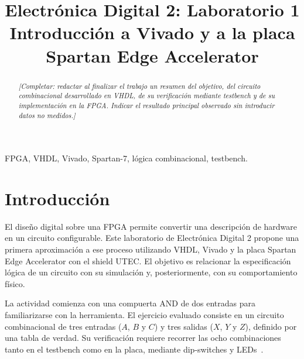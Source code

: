 \documentclass[conference]{IEEEtran}
\newcommand{\pendiente}[1]{\textit{[Completar: #1.]}}
\begin{document}
\title{Electrónica Digital 2: Laboratorio 1\\
Introducción a Vivado y a la placa Spartan Edge Accelerator}
\author{
\and
{}
}
\maketitle

\begin{abstract}
\pendiente{redactar al finalizar el trabajo un resumen del objetivo,
del circuito combinacional desarrollado en VHDL, de su verificación
mediante testbench y de su implementación en la FPGA. Indicar el
resultado principal observado sin introducir datos no medidos}
\end{abstract}
\begin{IEEEkeywords}
FPGA, VHDL, Vivado, Spartan-7, lógica combinacional, testbench.
\end{IEEEkeywords}

\section{Introducción}
El diseño digital sobre una FPGA permite convertir una descripción
de hardware en un circuito configurable. Este laboratorio de Electrónica
Digital 2 propone una primera aproximación a ese proceso utilizando
VHDL, Vivado y la placa Spartan Edge Accelerator con el shield UTEC.
El objetivo es relacionar la especificación lógica de un circuito con
su simulación y, posteriormente, con su comportamiento físico.

La actividad comienza con una compuerta AND de dos entradas para
familiarizarse con la herramienta. El ejercicio evaluado consiste en
un circuito combinacional de tres entradas ($A$, $B$ y $C$) y tres
salidas ($X$, $Y$ y $Z$), definido por una tabla de verdad. Su
verificación requiere recorrer las ocho combinaciones tanto en el
testbench como en la placa, mediante dip-switches y LEDs~\cite{guia}.
\end{document}
